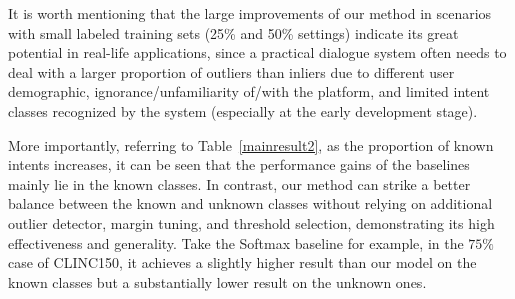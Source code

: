It is worth mentioning that the large improvements of our method in scenarios with small labeled training sets (25\% and 50\% settings) indicate its great potential in real-life applications, since a practical dialogue system often needs to deal with a larger proportion of outliers than inliers due to different user demographic, ignorance/unfamiliarity of/with the platform, and limited intent classes recognized by the system (especially at the early development stage). 

More importantly, referring to Table~\ref{mainresult2}, as the proportion of known intents increases, it can be seen that the performance gains of the baselines mainly lie in the known classes. In contrast, our method can strike a better balance between the known and unknown classes without relying on additional outlier detector, margin tuning, and threshold selection, demonstrating its high effectiveness and generality. 
Take the Softmax baseline for example, in the $75\%$ case of CLINC150, it achieves a slightly higher result than our model on the known classes but a substantially lower result on the unknown ones. 

